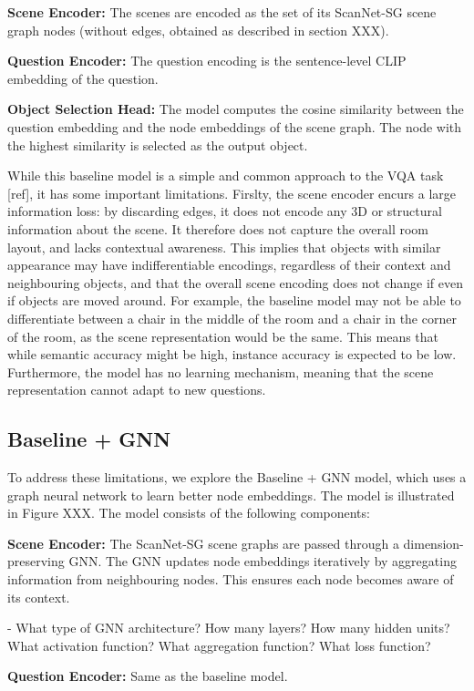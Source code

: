 \textbf{Scene Encoder:} The scenes are encoded as the set of its ScanNet-SG scene graph nodes (without edges, obtained as described in section XXX).

\textbf{Question Encoder:} The question encoding is the sentence-level CLIP embedding of the question.

\textbf{Object Selection Head:} The model computes the cosine similarity between the question embedding and the node embeddings of the scene graph. The node with the highest similarity is selected as the output object.

While this baseline model is a simple and common approach to the VQA task [ref], it has some important limitations. Firslty, the scene encoder encurs a large information loss: by discarding edges, it does not encode any 3D or structural information about the scene. It therefore does not capture the overall room layout, and lacks contextual awareness. This implies that objects with similar appearance may have indifferentiable encodings, regardless of their context and neighbouring objects, and that the overall scene encoding does not change if even if objects are moved around. For example, the baseline model may not be able to differentiate between a chair in the middle of the room and a chair in the corner of the room, as the scene representation would be the same. This means that while semantic accuracy might be high, instance accuracy is expected to be low. Furthermore, the model has no learning mechanism, meaning that the scene representation cannot adapt to new questions.

\subsection{Baseline + GNN}
To address these limitations, we explore the Baseline + GNN model, which uses a graph neural network to learn better node embeddings. The model is illustrated in Figure XXX. The model consists of the following components:

\textbf{Scene Encoder:} The ScanNet-SG scene graphs are passed through a dimension-preserving GNN. The GNN updates node embeddings iteratively by aggregating information from neighbouring nodes. This ensures each node becomes aware of its context.

- What type of GNN architecture? How many layers? How many hidden units? What activation function? What aggregation function? What loss function?

\textbf{Question Encoder:} Same as the baseline model.

